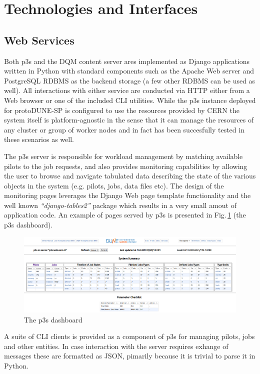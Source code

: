 \documentclass{webofc}
\newcommand{\pd}{protoDUNE\xspace}
\begin{document}
\section{Technologies and Interfaces}
\subsection{Web Services}

Both p3s and the DQM content server ares implemented as Django \cite{django} applications
written in Python
with standard components such as the Apache Web server and PostgreSQL RDBMS as the backend storage
(a few other RDBMS can be used as well). All interactions with either service
are conducted via HTTP either from a Web browser or one of the included CLI utilities.
While the p3s instance deployed for \pd-SP is configured to use
the resources provided by CERN the system itself is platform-agnostic in the sense that it can manage
the resources of any cluster or group of worker nodes and in fact has been succesfully tested
in these scenarios as well.

The p3s server is responsible for workload management by matching available pilots to the job requests,
and also provides monitoring capabilities by allowing the user to browse and navigate
tabulated data describing the state of the various objects in the system (e.g. pilots, jobs, data files etc).
The design of the monitoring pages leverages the Django Web page template functionality and
the well known \textit{``django-tables2''} package which results
in a very small amout of application code. An example of pages served by p3s is
presented in Fig.\,\ref{fig:p3s_dash} (the p3s dashboard).

\begin{figure}[tb]
\centering\includegraphics[width=1.0\textwidth]{figures/p3s_dash_2018_v1.png}
\caption{\label{fig:p3s_dash}The p3s dashboard}
\end{figure}

 A suite of CLI clients is provided as a component of p3s for managing pilots, jobs and
other entities. In case interaction with the server requires exhange of messages these are
formatted as JSON, pimarily because it is trivial to parse it in Python.
\end{document}
